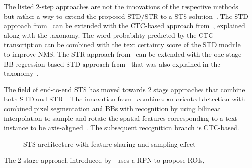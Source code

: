 The listed 2-step approaches are not the innovations of the respective methods but rather a
way to extend the proposed \ac{STD}/\ac{STR} to a \ac{STS}
solution~\citep{liao_textboxes_2018,shi_aster_2019}.
The \ac{STD} approach from~\cite{liao_textboxes_2018} can be extended with the \ac{CTC}-based
approach from~\cite{shi_end--end_2017}, explained along with the taxonomy.
The word probability predicted by the \ac{CTC} transcription can be combined with the
text certainty score of the \ac{STD} module to improve \ac{NMS}.
The \ac{STR} approach from~\cite{shi_aster_2019} can be extended with the one-stage
\ac{BB} regression-based \ac{STD} approach from~\cite{liao_textboxes_2017} that was also explained
in the taxonomy~\citep{shi_aster_2019}.

The field of end-to-end \ac{STS} has moved towards 2 stage approaches that combine both \ac{STD}
and \ac{STR}~\citep{lyu_mask_2018,long_scene_2021}.
The innovation from~\cite{liu_fots_2018} combines an oriented detection with combined pixel
segmentation and \acp{BB} with recognition by using bilinear interpolation to sample and rotate
the spatial features corresponding to a text instance to be axis-aligned~\citep{liu_fots_2018}.
The subsequent recognition branch is \ac{CTC}-based.
\begin{figure}[hb]
    \centering
    \caption[STS architecture with feature sharing]{%
        STS architecture with feature sharing and sampling
        effect~\citep{liu_fots_2018}\label{fig:2-stage-example-LIU-Fots-2018}
    }
\end{figure}
The 2 stage approach introduced by~\cite{lyu_mask_2018} uses a \ac{RPN} to propose \acp{ROI},
